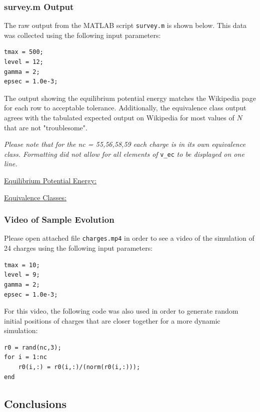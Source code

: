 \documentclass[10pt]{article}
\def\code#1{\texttt{#1}} %
\begin{document}
\subsubsection*{survey.m Output}

The raw output from the MATLAB script \code{survey.m} is shown below. This data was collected using
the following input parameters:
\begin{verbatim}
tmax = 500;
level = 12;
gamma = 2;
epsec = 1.0e-3;
\end{verbatim}
The output showing the equilibrium potential energy matches the Wikipedia page for each row to 
acceptable tolerance. Additionally, the equivalence class output agrees with the tabulated 
expected output on Wikipedia for most values of $N$ that are not "troublesome". 

\textit{Please note that for the nc = 55,56,58,59 each charge is in its own equivalence class. 
Formatting did not allow for all elements of} \code{v\_ec} \textit{to be displayed on one line.}

\underline{Equilibrium Potential Energy:}


\underline{Equivalence Classes:}


\subsubsection*{Video of Sample Evolution}

Please open attached file \code{charges.mp4} in order to see a video of the simulation of 24 charges 
using the following input parameters:
\begin{verbatim}
tmax = 10;
level = 9;
gamma = 2;
epsec = 1.0e-3;
\end{verbatim}
For this video, the following code was also used in order to generate random initial positions of charges
that are closer together for a more dynamic simulation:
\begin{verbatim}
r0 = rand(nc,3);
for i = 1:nc
    r0(i,:) = r0(i,:)/(norm(r0(i,:)));
end
\end{verbatim}

\subsection*{Conclusions}
\end{document}
